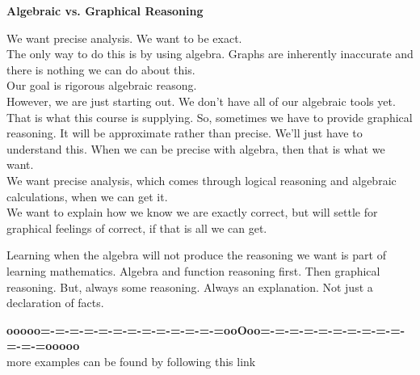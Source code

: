 \documentclass{ximera}
\begin{document}
\begin{warning}  \textbf{\textcolor{blue!55!black}{Algebraic vs. Graphical Reasoning}}


We want precise analysis.  We want to be exact. \\


The only way to do this is by using algebra.  Graphs are inherently inaccurate and there is nothing we can do about this. \\


Our goal is rigorous algebraic reasong. \\



However, we are just starting out.  We don't have all of our algebraic tools yet.  That is what this course is supplying.  So, sometimes we have to provide graphical reasoning.  It will be approximate rather than precise.  We'll just have to understand this.  When we can be precise with algebra, then that is what we want. \\


We want precise analysis, which comes through logical reasoning and algebraic calculations, when we can get it. \\


We want to explain how we know we are exactly correct, but will settle for graphical feelings of correct, if that is all we can get. \\


\end{warning}



Learning when the algebra will not produce the reasoning we want is part of learning mathematics.  Algebra and function reasoning first. Then graphical reasoning.  But, always some reasoning.  Always an explanation. Not just a declaration of facts.










\begin{center}
\textbf{\textcolor{green!50!black}{ooooo=-=-=-=-=-=-=-=-=-=-=-=-=ooOoo=-=-=-=-=-=-=-=-=-=-=-=-=ooooo}} \\

more examples can be found by following this link\\ 

\end{center}
\end{document}
